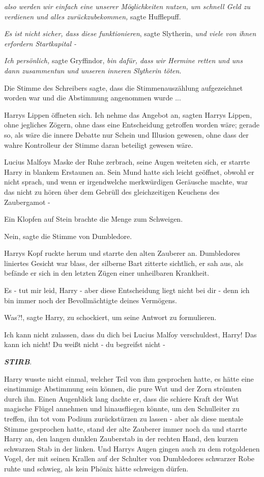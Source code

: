 \emph{also werden wir einfach eine unserer Möglichkeiten nutzen, um schnell Geld
zu verdienen und alles zurückzubekommen,} sagte Hufflepuff.

\emph{Es ist nicht sicher, dass diese funktionieren}, sagte Slytherin,\emph{ und
viele von ihnen erfordern Startkapital -}

\emph{Ich persönlich,} sagte Gryffindor, \emph{bin dafür, dass wir Hermine
retten und uns dann zusammentun und unseren inneren Slytherin töten}.

Die Stimme des Schreibers sagte, dass die Stimmenauszählung aufgezeichnet worden
war und die Abstimmung angenommen wurde ...

Harrys Lippen öffneten sich. \glqq{}Ich nehme das Angebot an\grqq{}, sagten
Harrys Lippen, ohne jegliches Zögern, ohne dass eine Entscheidung getroffen
worden wäre; gerade so, als wäre die innere Debatte nur Schein und Illusion
gewesen, ohne dass der wahre Kontrolleur der Stimme daran beteiligt gewesen
wäre.

Lucius Malfoys Maske der Ruhe zerbrach, seine Augen weiteten sich, er starrte
Harry in blankem Erstaunen an. Sein Mund hatte sich leicht geöffnet, obwohl er
nicht sprach, und wenn er irgendwelche merkwürdigen Geräusche machte, war das
nicht zu hören über dem Gebrüll des gleichzeitigen Keuchens des Zaubergamot -

Ein Klopfen auf Stein brachte die Menge zum Schweigen.

\glqq{}Nein\grqq{}, sagte die Stimme von Dumbledore.

Harrys Kopf ruckte herum und starrte den alten Zauberer an. Dumbledores
liniertes Gesicht war blass, der silberne Bart zitterte sichtlich, er sah aus,
als befände er sich in den letzten Zügen einer unheilbaren Krankheit.

\glqq{}Es - tut mir leid, Harry - aber diese Entscheidung liegt nicht bei dir -
denn ich bin immer noch der Bevollmächtigte deines Vermögens.\grqq{}

\glqq{}Was?!\grqq{}, sagte Harry, zu schockiert, um seine Antwort zu formulieren.

\glqq{}Ich kann nicht zulassen, dass du dich bei Lucius Malfoy verschuldest,
Harry! Das kann ich nicht! Du weißt nicht - du begreifst nicht -\grqq{}

\textbf{\emph{STIRB}}.

Harry wusste nicht einmal, welcher Teil von ihm gesprochen hatte, es hätte eine
einstimmige Abstimmung sein können, die pure Wut und der Zorn strömten durch
ihn. Einen Augenblick lang dachte er, dass die schiere Kraft der Wut magische
Flügel annehmen und hinausfliegen könnte, um den Schulleiter zu treffen, ihn tot
vom Podium zurückstürzen zu lassen - aber als diese mentale Stimme gesprochen
hatte, stand der alte Zauberer immer noch da und starrte Harry an, den langen
dunklen Zauberstab in der rechten Hand, den kurzen schwarzen Stab in der linken.
Und Harrys Augen gingen auch zu dem rotgoldenen Vogel, der mit seinen Krallen
auf der Schulter von Dumbledores schwarzer Robe ruhte und schwieg, als kein
Phönix hätte schweigen dürfen.

